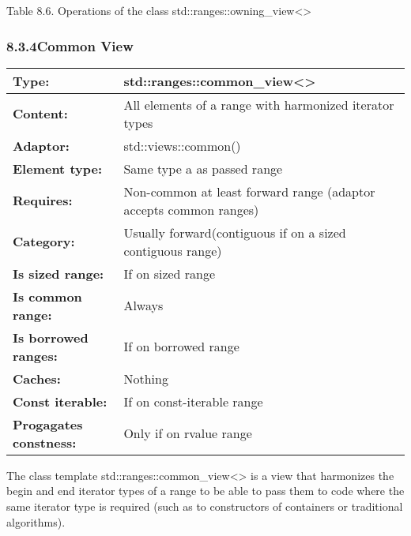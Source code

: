 \begin{center}
Table 8.6. Operations of the class std::ranges::owning\_view<>
\end{center}


\subsubsection*{ 8.3.4\hspace{0.2cm}Common View}

\begin{longtable}[c]{|l|l|}
\hline
\textbf{Type:}     & std::ranges::common\_view\textless{}\textgreater{}                \\ \hline
\endfirsthead
%
\endhead
%
\textbf{Content:}  & All elements of a range with harmonized iterator types            \\ \hline
\textbf{Adaptor:}              & std::views::common()        \\ \hline
\textbf{Element type:}         & Same type a as passed range \\ \hline
\textbf{Requires:} & Non-common at least forward range (adaptor accepts common ranges) \\ \hline
\textbf{Category:} & Usually forward(contiguous if on a sized contiguous range)        \\ \hline
\textbf{Is sized range:}       & If on sized range           \\ \hline
\textbf{Is common range:}      & Always                      \\ \hline
\textbf{Is borrowed ranges:}   & If on borrowed range        \\ \hline
\textbf{Caches:}               & Nothing                     \\ \hline
\textbf{Const iterable:}       & If on const-iterable range  \\ \hline
\textbf{Progagates constness:} & Only if on rvalue range     \\ \hline
\end{longtable}

The class template std::ranges::common\_view<> is a view that harmonizes the begin and end iterator types of a range to be able to pass them to code where the same iterator type is required (such as to constructors of containers or traditional algorithms).

